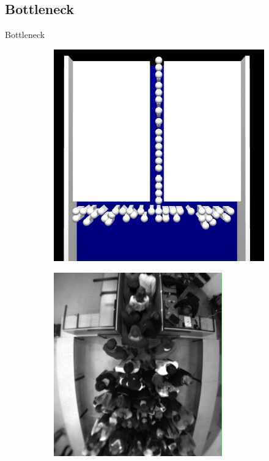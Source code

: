 \subsection{Bottleneck}
\begin{frame}{Bottleneck}

\begin{figure}
\centering
\begin{subfigure}{.5\textwidth}
  \centering
  \includegraphics[width=.9\linewidth]{obrazek-bottleneck}
\end{subfigure}%
\begin{subfigure}{.5\textwidth}
  \centering
  \includegraphics[width=.9\linewidth]{obrazek-bottleneck-real}
\end{subfigure}
\label{fig:test}
\end{figure}

\end{frame}

